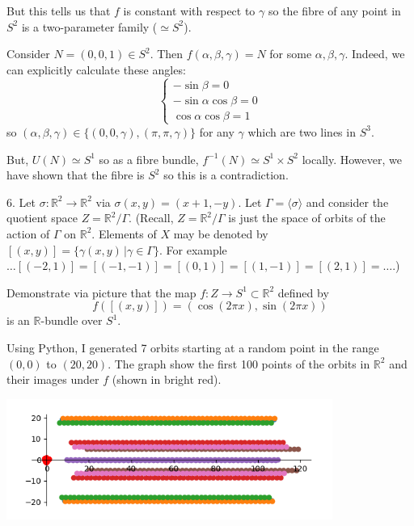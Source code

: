 \documentclass[12pt]{article}
\newcommand{\R}{\mathbb{R}}
\newcommand{\lra}{\longrightarrow}
\begin{document}
        But this tells us that $f$ is constant with respect to $\gamma$ so the fibre of any point in $S^2$ is a two-parameter family ($\simeq S^2$).

        Consider $N = (0, 0, 1) \in S^2$. Then $f(\alpha, \beta, \gamma) = N$ for some $\alpha, \beta, \gamma$. Indeed, we can explicitly calculate these angles: 
        \[\begin{cases}
            -\sin \beta = 0\\ 
            -\sin \alpha \cos \beta = 0\\
            \cos \alpha \cos \beta = 1
        \end{cases}\] 
        so $(\alpha, \beta, \gamma) \in \{(0, 0, \gamma), (\pi, \pi, \gamma)\}$ for any $\gamma$ which are two lines in $S^3$. 

        But, $U(N) \simeq S^1$ so as a fibre bundle, $f^{-1}(N) \simeq S^1 \times S^2$ locally. However, we have shown that the fibre is $S^2$ so this is a contradiction. 

    \color{black} 


\pagebreak 

6.  Let $\sigma: \R^{2} \lra \R^{2}$ via $\sigma(x,y) = (x+1,-y)$.  Let $\Gamma = \langle \sigma \rangle$ and consider the quotient space $Z = \R^{2}/\Gamma$.  (Recall, $Z = \R^{2}/\Gamma$ is just the space of orbits of the action of $\Gamma$ on $\R^{2}$.  Elements of $X$ may be denoted by $[(x,y)] = \{\gamma (x,y)\, | \gamma \in \Gamma \}$.  For example $\hdots [(-2,1)] = [(-1,-1)] = [(0,1)] = [(1,-1)] = [(2,1)] = \hdots$.)  

Demonstrate via picture that the map $f: Z \lra S^{1} \subset \R^{2}$ defined by
\[
f\left([(x,y)]\right) = \left( \cos(2\pi x), \sin(2\pi x) \right)
\]
is an $\R$-bundle over $S^{1}$. 

    \color{blue}
        Using Python, I generated 7 orbits starting at a random point in the range $(0, 0)$ to $(20, 20)$. The graph show the first 100 points of the orbits in $\R^2$ and their images under $f$ (shown in bright red). 

        \begin{center}
            \includegraphics[width=0.8\textwidth]{Images/R bundle.png}
        \end{center}
\end{document}
